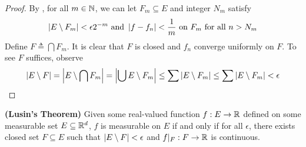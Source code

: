 \documentclass{report}
\begin{document}
\begin{proof}
By , for all $m \in\mathbb{N}$, we can let $F_m\subseteq E$ and integer $N_m$ satisfy 
 \begin{align*}
\left|E\setminus F_m\right|< \epsilon 2^{-m}\text{ and }\left|f-f_n\right|<\frac{1}{m}\text{ on }F_m\text{ for all }n>N_m
\end{align*}
Define $F\triangleq \bigcap F_m$. It is clear that $F$ is closed and  $f_n$ converge uniformly on  $F$. To see $F$ suffices, observe 
\begin{align*}
\left|E\setminus F\right|=\left|E\setminus \bigcap F_m\right|= \left|\bigcup E\setminus F_m\right|\leq \sum \left|E\setminus F_m\right|\leq  \sum \left|E\setminus F_m\right|<\epsilon 
\end{align*}
\end{proof}
\begin{theorem}
\textbf{(Lusin's Theorem)} Given some real-valued function $f:E\rightarrow \mathbb{R}$ defined on some measurable set $E\subseteq \mathbb{R}^d$, $f$ is measurable on  $E$ if and only if for all  $\epsilon $, there exists closed set $F\subseteq E$ such that $\left|E\setminus F\right|<\epsilon $ and $f|_F:F\rightarrow \mathbb{R}$ is continuous. 
\end{theorem}
\end{document}
